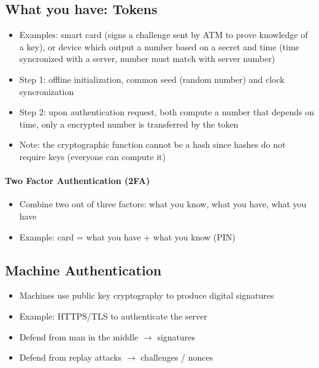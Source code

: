 \documentclass{article}
\newenvironment{myitemize}
{ \begin{itemize}
    \setlength{\itemsep}{005pt}
    \setlength{\parskip}{0pt}
    \setlength{\parsep}{0pt}     }
{ \end{itemize}                  }
\begin{document}
\begin{multicols}{2}
\subsection{What you have: Tokens}

\begin{myitemize}
    \item Examples: smart card (signs a challenge sent by ATM to prove knowledge of a key), or device which output a number based on a secret and time (time syncronized with a server, number must match with server number)
    \item Step 1: offline initialization, common seed (random number) and clock syncronization
    \item Step 2: upon authentication request, both compute a number that depends on time, only a encrypted number is transferred by the token
    \item Note: the cryptographic function cannot be a hash since hashes do not require keys (everyone can compute it)
\end{myitemize}

\paragraph{Two Factor Authentication (2FA)}

\begin{myitemize}
    \item Combine two out of three factors: what you know, what you have, what you have
    \item Example: card = what you have + what you know (PIN)
    
\end{myitemize}

\subsection{Machine Authentication}

\begin{myitemize}
    \item Machines use public key cryptography to produce digital signatures
    \item Example: HTTPS/TLS to authenticate the server
    \item Defend from man in the middle $\rightarrow$ signatures
    \item Defend from replay attacks $\rightarrow$ challenges / nonces
\end{myitemize}



\end{multicols}
\end{document}
